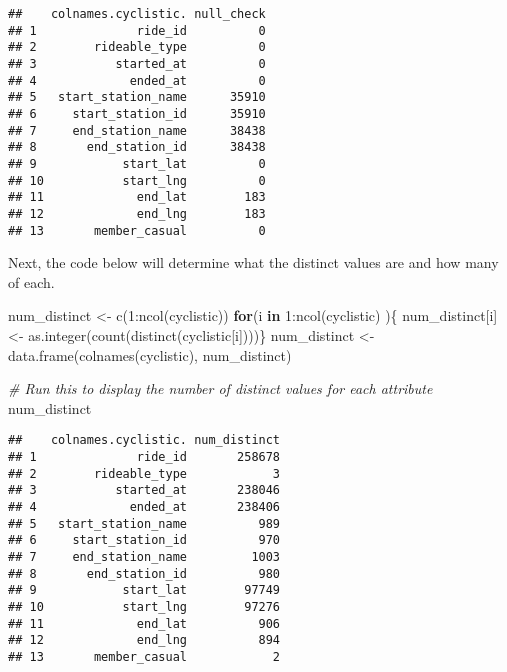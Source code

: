 \documentclass[
]{article}
\newenvironment{Shaded}{\begin{snugshade}}{\end{snugshade}}
\newcommand{\CommentTok}[1]{\textcolor[rgb]{0.56,0.35,0.01}{\textit{#1}}}
\newcommand{\ControlFlowTok}[1]{\textcolor[rgb]{0.13,0.29,0.53}{\textbf{#1}}}
\newcommand{\DecValTok}[1]{\textcolor[rgb]{0.00,0.00,0.81}{#1}}
\newcommand{\FunctionTok}[1]{\textcolor[rgb]{0.00,0.00,0.00}{#1}}
\newcommand{\NormalTok}[1]{#1}
\newcommand{\OtherTok}[1]{\textcolor[rgb]{0.56,0.35,0.01}{#1}}
\newcommand{\SpecialCharTok}[1]{\textcolor[rgb]{0.00,0.00,0.00}{#1}}
\begin{document}
\begin{verbatim}
##    colnames.cyclistic. null_check
## 1              ride_id          0
## 2        rideable_type          0
## 3           started_at          0
## 4             ended_at          0
## 5   start_station_name      35910
## 6     start_station_id      35910
## 7     end_station_name      38438
## 8       end_station_id      38438
## 9            start_lat          0
## 10           start_lng          0
## 11             end_lat        183
## 12             end_lng        183
## 13       member_casual          0
\end{verbatim}

Next, the code below will determine what the distinct values are and how
many of each.

\begin{Shaded}
\begin{Highlighting}[]
\NormalTok{num\_distinct }\OtherTok{\textless{}{-}} \FunctionTok{c}\NormalTok{(}\DecValTok{1}\SpecialCharTok{:}\FunctionTok{ncol}\NormalTok{(cyclistic))}
  \ControlFlowTok{for}\NormalTok{(i }\ControlFlowTok{in} \DecValTok{1}\SpecialCharTok{:}\FunctionTok{ncol}\NormalTok{(cyclistic) )\{}
\NormalTok{    num\_distinct[i] }\OtherTok{\textless{}{-}} \FunctionTok{as.integer}\NormalTok{(}\FunctionTok{count}\NormalTok{(}\FunctionTok{distinct}\NormalTok{(cyclistic[i])))\}}
\NormalTok{num\_distinct }\OtherTok{\textless{}{-}} \FunctionTok{data.frame}\NormalTok{(}\FunctionTok{colnames}\NormalTok{(cyclistic), num\_distinct)}
\end{Highlighting}
\end{Shaded}

\begin{Shaded}
\begin{Highlighting}[]
\CommentTok{\# Run this to display the number of distinct values for each attribute}
\NormalTok{num\_distinct}
\end{Highlighting}
\end{Shaded}

\begin{verbatim}
##    colnames.cyclistic. num_distinct
## 1              ride_id       258678
## 2        rideable_type            3
## 3           started_at       238046
## 4             ended_at       238406
## 5   start_station_name          989
## 6     start_station_id          970
## 7     end_station_name         1003
## 8       end_station_id          980
## 9            start_lat        97749
## 10           start_lng        97276
## 11             end_lat          906
## 12             end_lng          894
## 13       member_casual            2
\end{verbatim}
\end{document}
